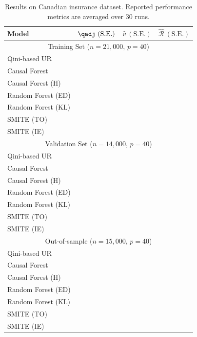 \begin{table}[H]
    \caption{Results on Canadian insurance dataset. Reported performance metrics are averaged over $30$ runs. }
    \centering
    \begin{tabular}{|p{3.3cm}||p{2.1cm}|p{1.8cm}|p{1.8cm}|}
         \hline
         Model &  $\qadj~(\mathrm{S.E.})$ & $\hat{v}~(\mathrm{S.E.})$ & $\hat{\mathcal{R}}~(\mathrm{S.E.})$\\
         \hline
         \multicolumn{4}{|c|}{Training Set ($n=21,000$, $p=40$)} \\
         \hline
         Qini-based UR  &  & & \\
         Causal Forest  &  & & \\
         Causal Forest (H) &  & & \\
         Random Forest (ED) &  & & \\
         Random Forest (KL) &  & & \\
         SMITE (TO) &  & & \\
         SMITE (IE) &  & & \\
         \hline
         \multicolumn{4}{|c|}{Validation Set ($n=14,000$, $p=40$)} \\
         \hline
         Qini-based UR  &  & & \\
         Causal Forest  &  & & \\
         Causal Forest (H) &  & & \\
         Random Forest (ED) &  & & \\
         Random Forest (KL) &  & & \\
         SMITE (TO) &  & & \\
         SMITE (IE) &  & & \\
         \hline
         \multicolumn{4}{|c|}{Out-of-sample ($n=15,000$, $p=40$)} \\
         \hline
         Qini-based UR  &  & & \\
         Causal Forest  &  & & \\
         Causal Forest (H) &  & & \\
         Random Forest (ED) &  & & \\
         Random Forest (KL) &  & & \\
         SMITE (TO) &  & & \\
         SMITE (IE) &  & & \\
         \hline
    \end{tabular}
        \label{tab:realdata_perf}
\end{table}